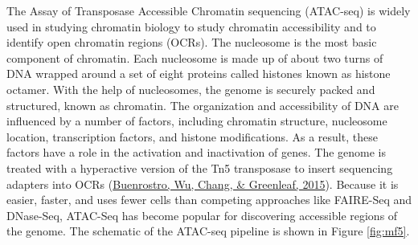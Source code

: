 \documentclass[12pt,twoside]{reedthesis}
\begin{document}
The Assay of Transposase Accessible Chromatin sequencing (ATAC-seq) is
widely used in studying chromatin biology to study chromatin
accessibility and to identify open chromatin regions (OCRs). The
nucleosome is the most basic component of chromatin. Each nucleosome is
made up of about two turns of DNA wrapped around a set of eight proteins
called histones known as histone octamer. With the help of nucleosomes,
the genome is securely packed and structured, known as chromatin. The
organization and accessibility of DNA are influenced by a number of
factors, including chromatin structure, nucleosome location,
transcription factors, and histone modifications. As a result, these
factors have a role in the activation and inactivation of genes. The
genome is treated with a hyperactive version of the Tn5 transposase to
insert sequencing adapters into OCRs (\protect\hyperlink{ref-buenrostro2015}{Buenrostro, Wu, Chang, \& Greenleaf, 2015}). Because it is
easier, faster, and uses fewer cells than competing approaches like
FAIRE-Seq and DNase-Seq, ATAC-Seq has become popular for discovering
accessible regions of the genome. The schematic of the ATAC-seq pipeline
is shown in Figure \ref{fig:mf5}.
\end{document}
